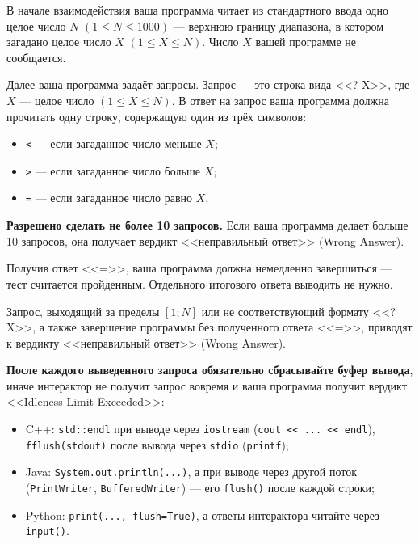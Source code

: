 В начале взаимодействия ваша программа читает из стандартного ввода одно целое число $N$ $(1 \le N \le 1000)$ --- верхнюю границу диапазона, в котором загадано целое число $X$ $(1 \le X \le N)$. Число $X$ вашей программе не сообщается.

Далее ваша программа задаёт запросы. Запрос --- это строка вида <<? X>>, где $X$ --- целое число $(1 \le X \le N)$. В ответ на запрос ваша программа должна прочитать одну строку, содержащую один из трёх символов:

\begin{itemize}
\item \texttt{<} --- если загаданное число меньше $X$;
\item \texttt{>} --- если загаданное число больше $X$;
\item \texttt{=} --- если загаданное число равно $X$.
\end{itemize}

\textbf{Разрешено сделать не более 10 запросов.} Если ваша программа делает больше 10 запросов, она получает вердикт <<неправильный ответ>> (Wrong Answer).

Получив ответ <<=>>, ваша программа должна немедленно завершиться --- тест считается пройденным. Отдельного итогового ответа выводить не нужно.

Запрос, выходящий за пределы $[1; N]$ или не соответствующий формату <<? X>>, а также завершение программы без полученного ответа <<=>>, приводят к вердикту <<неправильный ответ>> (Wrong Answer).

\textbf{После каждого выведенного запроса обязательно сбрасывайте буфер вывода}, иначе интерактор не получит запрос вовремя и ваша программа получит вердикт <<Idleness Limit Exceeded>>:

\begin{itemize}
\item C++: \texttt{std::endl} при выводе через \texttt{iostream} (\texttt{cout << ... << endl}), \texttt{fflush(stdout)} после вывода через \texttt{stdio} (\texttt{printf});
\item Java: \texttt{System.out.println(...)}, а при выводе через другой поток (\texttt{PrintWriter}, \texttt{BufferedWriter}) --- его \texttt{flush()} после каждой строки;
\item Python: \texttt{print(..., flush=True)}, а ответы интерактора читайте через \texttt{input()}.
\end{itemize}
